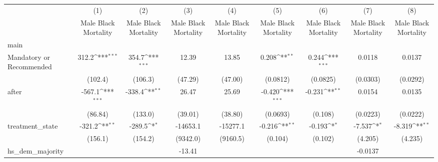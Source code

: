 {
\def\sym#1{\ifmmode^{#1}\else\(^{#1}\)\fi}
\begin{longtable}{l*{8}{c}}
\hline\hline\endfirsthead\hline\endhead\hline\endfoot\endlastfoot
                    &\multicolumn{1}{c}{(1)}&\multicolumn{1}{c}{(2)}&\multicolumn{1}{c}{(3)}&\multicolumn{1}{c}{(4)}&\multicolumn{1}{c}{(5)}&\multicolumn{1}{c}{(6)}&\multicolumn{1}{c}{(7)}&\multicolumn{1}{c}{(8)}\\
                    &\multicolumn{1}{c}{Male Black Mortality}&\multicolumn{1}{c}{Male Black Mortality}&\multicolumn{1}{c}{Male Black Mortality}&\multicolumn{1}{c}{Male Black Mortality}&\multicolumn{1}{c}{Male Black Mortality}&\multicolumn{1}{c}{Male Black Mortality}&\multicolumn{1}{c}{Male Black Mortality}&\multicolumn{1}{c}{Male Black Mortality}\\
\hline
main                &                     &                     &                     &                     &                     &                     &                     &                     \\
Mandatory or Recommended&       312.2\sym{***}&       354.7\sym{***}&       12.39         &       13.85         &       0.208\sym{**} &       0.244\sym{***}&      0.0118         &      0.0137         \\
                    &     (102.4)         &     (106.3)         &     (47.29)         &     (47.00)         &    (0.0812)         &    (0.0825)         &    (0.0303)         &    (0.0292)         \\
[1em]
after               &      -567.1\sym{***}&      -338.4\sym{**} &       26.47         &       25.69         &      -0.420\sym{***}&      -0.231\sym{**} &      0.0154         &      0.0135         \\
                    &     (86.84)         &     (133.0)         &     (39.01)         &     (38.80)         &    (0.0693)         &     (0.108)         &    (0.0223)         &    (0.0222)         \\
[1em]
treatment\_state     &      -321.2\sym{**} &      -289.5\sym{*}  &    -14653.1         &    -15277.1         &      -0.216\sym{**} &      -0.193\sym{*}  &      -7.537\sym{*}  &      -8.319\sym{**} \\
                    &     (156.1)         &     (154.2)         &    (9342.0)         &    (9160.5)         &     (0.104)         &     (0.102)         &     (4.205)         &     (4.235)         \\
[1em]
hs\_dem\_majority     &                     &                     &      -13.41         &                     &                     &                     &     -0.0137         &                     \\

\end{longtable}}
